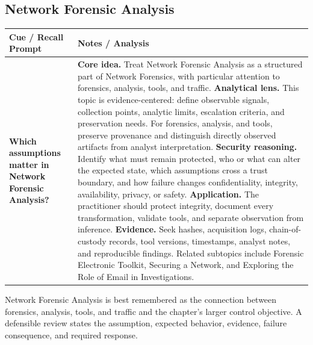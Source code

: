 \documentclass[11pt]{article}
\newcommand{\CornellHeader}{%
\rowcolor{Navy}\color{white}\bfseries Cue / Recall Prompt & \color{white}\bfseries Notes / Analysis\\\hline}
\newcommand{\CornellRow}[2]{%
\cellcolor{CueGray}\RaggedRight\textbf{#1} & \RaggedRight #2\\\hline}
\begin{document}
\subsection*{Network Forensic Analysis}
\begin{longtable}{>{\RaggedRight\arraybackslash}p{}|>{\RaggedRight\arraybackslash}p{}}
\CornellHeader
\CornellRow{Which assumptions matter in Network Forensic Analysis?}{\textbf{Core idea.} Treat Network Forensic Analysis as a structured part of Network Forensics, with particular attention to forensics, analysis, tools, and traffic. \textbf{Analytical lens.} This topic is evidence-centered: define observable signals, collection points, analytic limits, escalation criteria, and preservation needs. For forensics, analysis, and tools, preserve provenance and distinguish directly observed artifacts from analyst interpretation. \textbf{Security reasoning.} Identify what must remain protected, who or what can alter the expected state, which assumptions cross a trust boundary, and how failure changes confidentiality, integrity, availability, privacy, or safety. \textbf{Application.} The practitioner should protect integrity, document every transformation, validate tools, and separate observation from inference. \textbf{Evidence.} Seek hashes, acquisition logs, chain-of-custody records, tool versions, timestamps, analyst notes, and reproducible findings. Related subtopics include Forensic Electronic Toolkit, Securing a Network, and Exploring the Role of Email in Investigations.}
\end{longtable}
\begin{topicsummary}
Network Forensic Analysis is best remembered as the connection between forensics, analysis, tools, and traffic and the chapter's larger control objective. A defensible review states the assumption, expected behavior, evidence, failure consequence, and required response.
\end{topicsummary}
\end{document}
